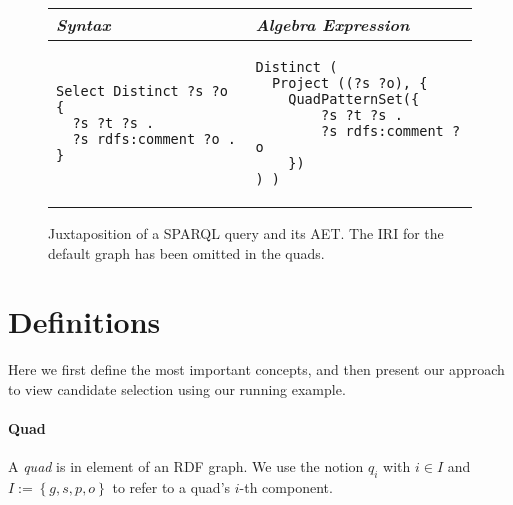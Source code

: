 \documentclass[a4paper,twoside,bibtotoc,abstracton,12pt,BCOR=15mm]{scrreprt}
\begin{document}
\begin{figure}[!h]
\centering
\begin{tabular}{ll}
\toprule
\emph{Syntax} & \emph{Algebra Expression} \\ 
\midrule

\begin{minipage}{6cm}
\begin{scriptsize}
\begin{verbatim}
Select Distinct ?s ?o {
  ?s ?t ?s .
  ?s rdfs:comment ?o .
}
\end{verbatim}
\end{scriptsize}
\end{minipage}

&

\begin{minipage}{6cm}
\begin{scriptsize}
\begin{verbatim}
Distinct (
  Project ((?s ?o), {
    QuadPatternSet({
        ?s ?t ?s .
        ?s rdfs:comment ?o
    })
) )
\end{verbatim}
\end{scriptsize}
\end{minipage}

\\

\bottomrule
\end{tabular}

\caption{Juxtaposition of a SPARQL query and its AET. The IRI for the default graph has been omitted in the quads.}
\label{fig:juxtapose-syntax-algebra}
\end{figure}

\section{Definitions}
Here we first define the most important concepts, and then present our approach to view candidate selection using our running example.

\paragraph{Quad}
A \emph{quad} is in element of an RDF graph. We use the notion $q_i$ with $i \in I$ and $I := \left\{g, s, p, o \right\}$ to refer to a quad's $i$-th component. 
\end{document}
